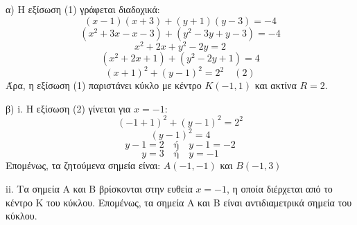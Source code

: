 α) Η εξίσωση (1) γράφεται διαδοχικά:
\[
(x - 1)(x + 3) + (y + 1)(y - 3) = -4
\]
\[
(x^2 + 3x - x - 3) + (y^2 - 3y + y - 3) = -4
\]
\[
x^2 + 2x + y^2 - 2y = 2
\]
\[
(x^2 + 2x + 1) + (y^2 - 2y + 1) = 4
\]
\[
(x + 1)^2 + (y - 1)^2 = 2^2 \quad (2)
\]
Άρα, η εξίσωση (1) παριστάνει κύκλο με κέντρο $K(-1,1)$ και ακτίνα $R = 2$.

β)
i. Η εξίσωση (2) γίνεται για $x = -1$:
\[
(-1 + 1)^2 + (y - 1)^2 = 2^2
\]
\[
(y - 1)^2 = 4
\]
\[
y - 1 = 2 \quad \text{ή} \quad y - 1 = -2
\]
\[
y = 3 \quad \text{ή} \quad y = -1
\]
Επομένως, τα ζητούμενα σημεία είναι:
$A(-1, -1)$ και $B(-1,3)$

ii. Τα σημεία Α και Β βρίσκονται στην ευθεία $x = -1$, η οποία διέρχεται από το κέντρο K του κύκλου. Επομένως, τα σημεία Α και Β είναι αντιδιαμετρικά σημεία του κύκλου.
